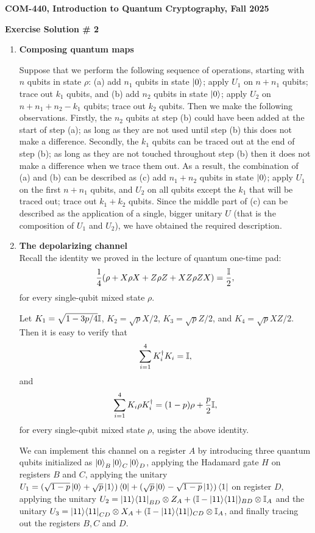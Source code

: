 \documentclass[12pt]{article}
\newcommand{\header}[1]{\begin{center} {\large\bf #1} \end{center}}
\begin{document}
\header{COM-440, Introduction to Quantum Cryptography, Fall 2025}
\header{\bf Exercise Solution \# 2}


\begin{enumerate}

\item {\bf Composing quantum maps}

Suppose that we perform the following sequence of operations, starting with $n$ qubits in state $\rho$: (a) add $n_1$ qubits in state $\ket{0}$; apply $U_1$ on $n+n_1$ qubits; trace out $k_1$ qubits, and (b) add $n_2$ qubits in state $\ket{0}$; apply $U_2$ on $n+n_1+n_2-k_1$ qubits; trace out $k_2$ qubits. Then we make the following observations. Firstly, the $n_2$ qubits at step (b) could have been added at the start of step (a); as long as they are not used until step (b) this does not make a difference. Secondly, the $k_1$ qubits can be traced out at the end of step (b); as long as they are not touched throughout step (b) then it does not make a difference when we trace them out. As a result, the combination of (a) and (b) can be described as (c) add $n_1+n_2$ qubits in state $\ket{0}$; apply $U_1$ on the first $n+n_1$ qubits, and $U_2$ on all qubits except the $k_1$ that will be traced out; trace out $k_1+k_2$ qubits. Since the middle part of (c) can be described as the application of a single, bigger unitary $U$ (that is the composition of $U_1$ and $U_2$), we have obtained the required description. 


\item {\bf The depolarizing channel}\\
Recall the identity we proved in the lecture of quantum one-time pad:
\begin{align*}
\frac{1}{4}(\rho + X\rho X + Z \rho Z + XZ \rho ZX) = \frac{\mathbb{I}}{2},	
\end{align*}
for every single-qubit mixed state $\rho$.

Let $K_1 = \sqrt{1 - 3p/4}\mathbb{I}$, $K_2 = \sqrt{p}X/2$, $K_3 = \sqrt{p}Z/2$, and $K_4 = \sqrt{p}XZ/2$. Then it is easy to verify that
\begin{align*}
\sum_{i = 1}^4 K_i^\dagger K_i = \mathbb{I},
\end{align*}
and
\begin{align*}
\sum_{i = 1}^4 K_i \rho K_i^\dagger = (1 - p)\rho + \frac{p}{2}\mathbb{I},
\end{align*}
for every single-qubit mixed state $\rho$, using the above identity.

We can implement this channel on a register $A$ by introducing three quantum qubits initialized as $\ket{0}_B\ket{0}_C\ket{0}_D$, applying the Hadamard gate $H$ on registers $B$ and $C$, applying the unitary $U_1 = (\sqrt{1 - p}\ket{0} + \sqrt{p}\ket{1})\bra{0} + (\sqrt{p}\ket{0} - \sqrt{1 - p}\ket{1})\bra{1}$ on register $D$, applying the unitary $U_2 = \ket{11}\!\bra{11}_{BD} \otimes Z_A + (\mathbb{I} - \ket{11}\!\bra{11})_{BD} \otimes \mathbb{I}_A$ and the unitary $U_3 = \ket{11}\!\bra{11}_{CD} \otimes X_A + (\mathbb{I} - \ket{11}\!\bra{11})_{CD} \otimes \mathbb{I}_A$, and finally tracing out the registers $B, C$ and $D$.




\end{enumerate}
\end{document}
